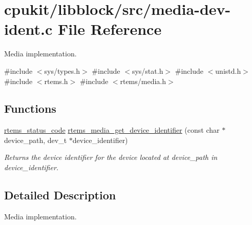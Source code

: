 \hypertarget{media-dev-ident_8c}{}\section{cpukit/libblock/src/media-\/dev-\/ident.c File Reference}
\label{media-dev-ident_8c}


Media implementation.  


{\ttfamily \#include $<$sys/types.\+h$>$}\newline
{\ttfamily \#include $<$sys/stat.\+h$>$}\newline
{\ttfamily \#include $<$unistd.\+h$>$}\newline
{\ttfamily \#include $<$rtems.\+h$>$}\newline
{\ttfamily \#include $<$rtems/media.\+h$>$}\newline
\subsection*{Functions}
\begin{DoxyCompactItemize}
\item 
\mbox{\hyperlink{group__ClassicStatus_ga545d41846817eaba6143d52ee4d9e9fe}{rtems\+\_\+status\+\_\+code}} \mbox{\hyperlink{group__RTEMSIOMedia_ga5eaaa6cfb5a7e811e5deadb77ca2aaa2}{rtems\+\_\+media\+\_\+get\+\_\+device\+\_\+identifier}} (const char $\ast$device\+\_\+path, dev\+\_\+t $\ast$device\+\_\+identifier)
\begin{DoxyCompactList}\small\item\em Returns the device identifier for the device located at {\itshape device\+\_\+path} in {\itshape device\+\_\+identifier}. \end{DoxyCompactList}\end{DoxyCompactItemize}


\subsection{Detailed Description}
Media implementation. 


